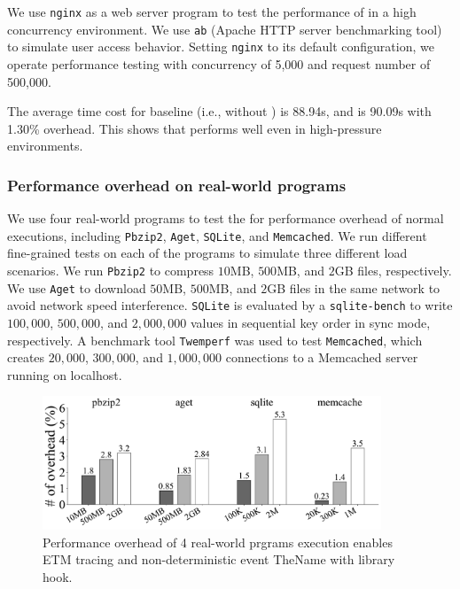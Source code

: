 We use \texttt{nginx} \cite{nginx_1.20.0} as a web server program to test the
performance of \TheName in a high concurrency environment. We use \texttt{ab}
(Apache HTTP server benchmarking tool) \cite{ApacheBench} to simulate user
access behavior. Setting \texttt{nginx} to its default configuration, we operate
performance testing with concurrency of 5,000 and request number of 500,000.

The average time cost for baseline (i.e., without \TheName) is 88.94s, and
\TheName is 90.09s with 1.30\% overhead. This shows that \TheName performs well
even in high-pressure environments.

\subsubsection{Performance overhead on real-world programs} \label{subsec:eva-Performance-Normal}

We use four real-world programs to test the \TheName for performance overhead of
normal executions, including \texttt{Pbzip2}, \texttt{Aget}, \texttt{SQLite},
and \texttt{Memcached}. We run different fine-grained tests on each of the
programs to simulate three different load scenarios. We run \texttt{Pbzip2} to
compress $10$MB, $500$MB, and $2$GB files, respectively. We use \texttt{Aget} to
download $50$MB, $500$MB, and $2$GB files in the same network to
avoid network speed interference. \texttt{SQLite} is evaluated by a
\texttt{sqlite-bench} \cite{sqlitebench} to write $100,000$, $500,000$, and
$2,000,000$ values in sequential key order in sync mode, respectively. A
benchmark tool \texttt{Twemperf} \cite{twemperf} was used to test
\texttt{Memcached}, which creates $20,000$, $300,000$, and $1,000,000$
connections to a Memcached server running on localhost.

\begin{figure}
    \centering
    \includegraphics[width=0.9\textwidth]{figures/normaloverheadbar.pdf}
    \caption{Performance overhead of 4 real-world prgrams execution enables ETM tracing and non-deterministic event TheName with library hook.}
    \label{fig:Performance overhead of Normal Execution}
\end{figure}


